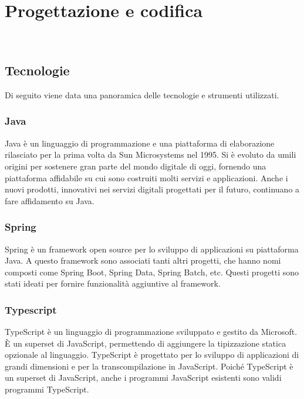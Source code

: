 
\chapter{Progettazione e codifica}
\label{cap:progettazione-codifica}

\\

\section{Tecnologie}
\label{sec:tecnologie-strumenti}

Di seguito viene data una panoramica delle tecnologie e strumenti utilizzati.

\subsection*{Java}
Java è un linguaggio di programmazione e una piattaforma di elaborazione 
rilasciato per la prima volta da Sun Microsystems nel 1995. Si è evoluto da umili
 origini per sostenere gran parte del mondo digitale di oggi, fornendo una
 piattaforma affidabile su cui sono costruiti molti servizi e applicazioni. 
 Anche i nuovi prodotti, innovativi nei servizi digitali progettati per il futuro,  
 continuano a fare affidamento su Java.
\subsection*{Spring}
Spring è un \gls{framework} open source per lo sviluppo di applicazioni su piattaforma Java.
A questo \gls{framework} sono associati tanti altri progetti, che hanno nomi composti come 
Spring Boot, Spring Data, Spring Batch, etc. Questi progetti sono stati ideati per
fornire funzionalità aggiuntive al \gls{framework}.

\subsection*{Typescript}
TypeScript è un linguaggio di programmazione sviluppato e gestito da Microsoft. 
È un \gls{superset} di JavaScript, permettendo di aggiungere la tipizzazione 
statica opzionale al linguaggio. TypeScript è progettato per lo sviluppo di applicazioni 
di grandi dimensioni e per la \gls{transcompilazione} in JavaScript. Poiché TypeScript è un \gls{superset} di JavaScript, anche i programmi JavaScript esistenti sono validi programmi TypeScript.

